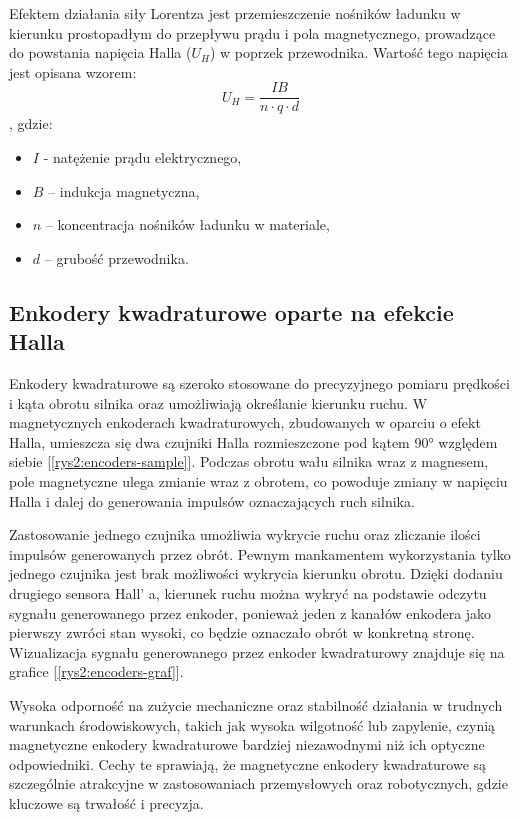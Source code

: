 Efektem działania siły Lorentza jest przemieszczenie nośników ładunku w kierunku prostopadłym do przepływu prądu i pola magnetycznego, prowadzące do powstania napięcia Halla (\( U_H \)) w poprzek przewodnika. Wartość tego napięcia jest opisana wzorem:
\[
U_H = \frac{I B}{n \cdot q \cdot d}
\]
, gdzie:
\begin{itemize}
    \item \( I \) - natężenie prądu elektrycznego,
    \item \( B \) – indukcja magnetyczna,
    \item \( n \) – koncentracja nośników ładunku w materiale,
    \item \( d \) – grubość przewodnika.
\end{itemize}

\subsection{Enkodery kwadraturowe oparte na efekcie Halla}

Enkodery kwadraturowe są szeroko stosowane do precyzyjnego pomiaru prędkości i kąta obrotu silnika oraz umożliwiają określanie kierunku ruchu. W magnetycznych enkoderach kwadraturowych, zbudowanych w oparciu o efekt Halla, umieszcza się dwa czujniki Halla rozmieszczone pod kątem 90° względem siebie [\ref{rys2:encoders-sample}]. Podczas obrotu wału silnika wraz z magnesem, pole magnetyczne ulega zmianie wraz z obrotem, co powoduje zmiany w napięciu Halla i dalej do generowania impulsów oznaczających ruch silnika. 

Zastosowanie jednego czujnika umożliwia wykrycie ruchu oraz zliczanie ilości impulsów generowanych przez obrót. Pewnym mankamentem wykorzystania tylko jednego czujnika jest brak możliwości wykrycia kierunku obrotu. Dzięki dodaniu drugiego sensora Hall' a, kierunek ruchu można wykryć na podstawie odczytu sygnału generowanego przez enkoder, ponieważ jeden z kanałów enkodera jako pierwszy zwróci stan wysoki, co będzie oznaczało obrót w konkretną stronę. Wizualizacja sygnału generowanego przez enkoder kwadraturowy znajduje się na grafice [\ref{rys2:encoders-graf}].

Wysoka odporność na zużycie mechaniczne oraz stabilność działania w trudnych warunkach środowiskowych, takich jak wysoka wilgotność lub zapylenie, czynią magnetyczne enkodery kwadraturowe bardziej niezawodnymi niż ich optyczne odpowiedniki. Cechy te sprawiają, że magnetyczne enkodery kwadraturowe są szczególnie atrakcyjne w zastosowaniach przemysłowych oraz robotycznych, gdzie kluczowe są trwałość i precyzja.

